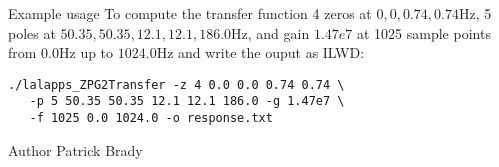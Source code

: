 \begin{entry}
\item[Example usage]
To compute the transfer function 4 zeros at $0,0,0.74,0.74$Hz,  5
poles at $50.35,50.35,12.1,12.1,186.0$Hz,  and gain $1.47e7$ at 1025
sample points from $0.0$Hz up to $1024.0$Hz and write the ouput as
ILWD:
\begin{verbatim}
./lalapps_ZPG2Transfer -z 4 0.0 0.0 0.74 0.74 \
   -p 5 50.35 50.35 12.1 12.1 186.0 -g 1.47e7 \
   -f 1025 0.0 1024.0 -o response.txt
\end{verbatim}

\item[Author]
Patrick Brady

\end{entry}
